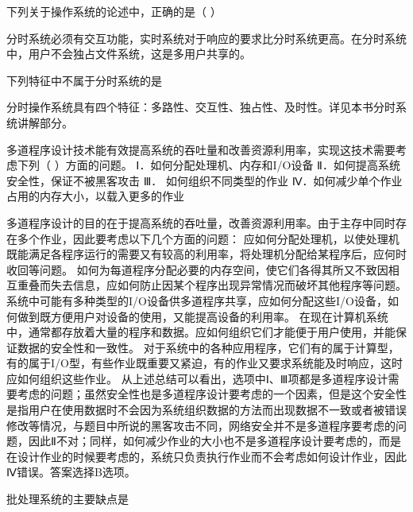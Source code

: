 \question 下列关于操作系统的论述中，正确的是（ ）
\par{}
\begin{solution}分时系统必须有交互功能，实时系统对于响应的要求比分时系统更高。在分时系统中，用户不会独占文件系统，这是多用户共享的。
\end{solution}
\question 下列特征中不属于分时系统的是
\par{}
\begin{solution}分时操作系统具有四个特征：多路性、交互性、独占性、及时性。详见本书分时系统讲解部分。
\end{solution}
\question 多道程序设计技术能有效提高系统的吞吐量和改善资源利用率，实现这技术需要考虑下列（
）方面的问题。 Ⅰ．如何分配处理机、内存和I/O设备
Ⅱ．如何提高系统安全性，保证不被黑客攻击 Ⅲ． 如何组织不同类型的作业
Ⅳ．如何减少单个作业占用的内存大小，以载入更多的作业
\par{}
\begin{solution}多道程序设计的目的在于提高系统的吞吐量，改善资源利用率。由于主存中同时存在多个作业，因此要考虑以下几个方面的问题：
应如何分配处理机，以使处理机既能满足各程序运行的需要又有较高的利用率，将处理机分配给某程序后，应何时收回等问题。
如何为每道程序分配必要的内存空间，使它们各得其所又不致因相互重叠而失去信息，应如何防止因某个程序出现异常情况而破坏其他程序等问题。
系统中可能有多种类型的I/O设备供多道程序共享，应如何分配这些I/O设备，如何做到既方便用户对设备的使用，又能提高设备的利用率。
在现在计算机系统中，通常都存放着大量的程序和数据。应如何组织它们才能便于用户使用，并能保证数据的安全性和一致性。
对于系统中的各种应用程序，它们有的属于计算型，有的属于I/O型，有些作业既重要又紧迫，有的作业又要求系统能及时响应，这时应如何组织这些作业。
从上述总结可以看出，选项中Ⅰ、Ⅲ项都是多道程序设计需要考虑的问题；虽然安全性也是多道程序设计要考虑的一个因素，但是这个安全性是指用户在使用数据时不会因为系统组织数据的方法而出现数据不一致或者被错误修改等情况，与题目中所说的黑客攻击不同，网络安全并不是多道程序要考虑的问题，因此Ⅱ不对；同样，如何减少作业的大小也不是多道程序设计要考虑的，而是在设计作业的时候要考虑的，系统只负责执行作业而不会考虑如何设计作业，因此Ⅳ错误。答案选择B选项。
\end{solution}
\question 批处理系统的主要缺点是
\par{}
